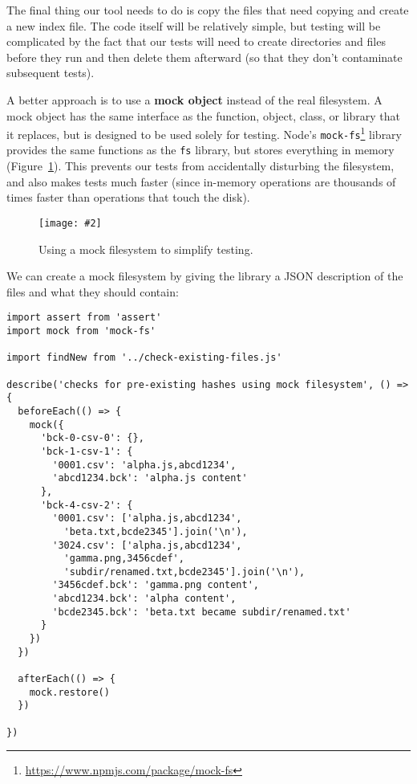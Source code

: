 \documentclass[krantzl]{krantz}
\newcommand{\figpdf}[4]{\begin{figure}%
\centering%
\texttt{[image: \#2]}%
\caption{#3}%
\label{#1}%
\end{figure}}
\newcommand{\figref}[1]{Figure~\ref{#1}}
\newcommand{\glossref}[1]{\textbf{#1}}
\newcommand{\hreffoot}[2]{{#1}\footnote{\href{#2}{#2}}}
\begin{document}
The final thing our tool needs to do
is copy the files that need copying and create a new index file.
The code itself will be relatively simple,
but testing will be complicated by the fact
that our tests will need to create directories and files before they run
and then delete them afterward
(so that they don't contaminate subsequent tests).


A better approach is to use a \glossref{mock object}
instead of the real filesystem.
A mock object has the same interface as the function, object, class, or library that it replaces,
but is designed to be used solely for testing.
Node's \hreffoot{\texttt{mock-fs}}{https://www.npmjs.com/package/mock-fs} library provides the same functions as the \texttt{fs} library,
but stores everything in memory
(\figref{file-backup-mock-fs}).
This prevents our tests from accidentally disturbing the filesystem,
and also makes tests much faster
(since in-memory operations are thousands of times faster than operations that touch the disk).

\figpdf{file-backup-mock-fs}{./file-backup/mock-fs.pdf}{Using a mock filesystem to simplify testing.}{0.6}


We can create a mock filesystem by giving the library a JSON description of
the files and what they should contain:


\begin{lstlisting}[frame=single,frameround=tttt]
import assert from 'assert'
import mock from 'mock-fs'

import findNew from '../check-existing-files.js'

describe('checks for pre-existing hashes using mock filesystem', () => {
  beforeEach(() => {
    mock({
      'bck-0-csv-0': {},
      'bck-1-csv-1': {
        '0001.csv': 'alpha.js,abcd1234',
        'abcd1234.bck': 'alpha.js content'
      },
      'bck-4-csv-2': {
        '0001.csv': ['alpha.js,abcd1234',
          'beta.txt,bcde2345'].join('\n'),
        '3024.csv': ['alpha.js,abcd1234',
          'gamma.png,3456cdef',
          'subdir/renamed.txt,bcde2345'].join('\n'),
        '3456cdef.bck': 'gamma.png content',
        'abcd1234.bck': 'alpha content',
        'bcde2345.bck': 'beta.txt became subdir/renamed.txt'
      }
    })
  })

  afterEach(() => {
    mock.restore()
  })

})
\end{lstlisting}
\end{document}
